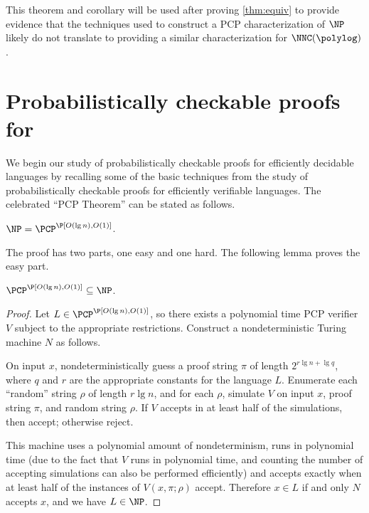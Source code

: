 \documentclass{article}
\begin{document}
This theorem and corollary will be used after proving \autoref{thm:equiv} to provide evidence that the techniques used to construct a PCP characterization of $\NP$ likely do not translate to providing a similar characterization for $\NNC(\polylog)$.

\section{Probabilistically checkable proofs for \texorpdfstring{\NP}{NP}}

We begin our study of probabilistically checkable proofs for efficiently decidable languages by recalling some of the basic techniques from the study of probabilistically checkable proofs for efficiently verifiable languages.
The celebrated ``PCP Theorem'' can be stated as follows.

\begin{theorem}
  $\NP = \PCP^\P[O(\lg n), O(1)]$.
\end{theorem}

The proof has two parts, one easy and one hard.
The following lemma proves the easy part.

\begin{lemma}\label{lem:pcpinnp}
  $\PCP^\P[O(\lg n), O(1)] \subseteq \NP$.
\end{lemma}
\begin{proof}
  Let $L \in \PCP^\P[O(\lg n), O(1)]$, so there exists a polynomial time PCP verifier $V$ subject to the appropriate restrictions.
  Construct a nondeterministic Turing machine $N$ as follows.

  On input $x$, nondeterministically guess a proof string $\pi$ of length $2^{r \lg n + \lg q}$, where $q$ and $r$ are the appropriate constants for the language $L$.
  Enumerate each ``random'' string $\rho$ of length $r \lg  n$, and for each $\rho$, simulate $V$ on input $x$, proof string $\pi$, and random string $\rho$.
  If $V$ accepts in at least half of the simulations, then accept; otherwise reject.

  This machine uses a polynomial amount of nondeterminism, runs in polynomial time (due to the fact that $V$ runs in polynomial time, and counting the number of accepting simulations can also be performed efficiently) and accepts exactly when at least half of the instances of $V(x, \pi; \rho)$ accept.
  Therefore $x \in L$ if and only $N$ accepts $x$, and we have $L \in \NP$.  
\end{proof}
\end{document}
